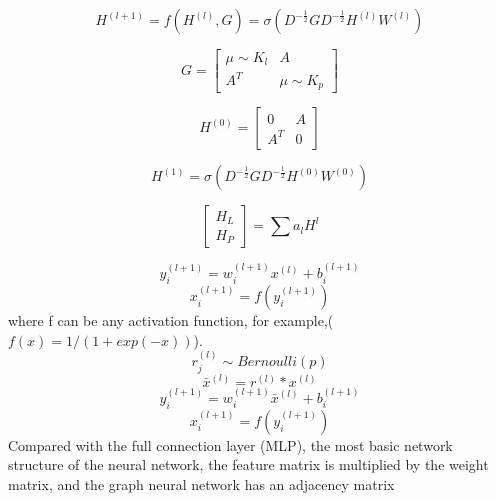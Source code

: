\documentclass[fleqn,10pt]{wlscirep}
\begin{document}
\begin{equation}
{H^{(l + 1)}} = f({H^{(l)}},G) = \sigma ({D^{ - \frac{1}{2}}}G{D^{ - \frac{1}{2}}}{H^{(l)}}{W^{(l)}})
\end{equation}

\begin{equation}
G = \left[ {\begin{array}{*{20}{c}}
{\mu  \sim {K_l}}&A\\
{{A^T}}&{\mu  \sim {K_p}}
\end{array}} \right]
\end{equation}

\begin{equation}
{H^{(0)}} = \left[ {\begin{array}{*{20}{c}}
0&A\\
{{A^T}}&0
\end{array}} \right]
\end{equation}

\begin{equation}
{H^{(1)}} = \sigma ({D^{ - \frac{1}{2}}}G{D^{ - \frac{1}{2}}}{H^{(0)}}{W^{(0)}})
\end{equation}


\begin{equation}
\left[ {\begin{array}{*{20}{c}}
{{H_L}}\\
{{H_P}}
\end{array}} \right] = \sum {{a_l}{H^l}}
\end{equation}

\begin{equation}
y_i^{(l + 1)} = w_i^{(l + 1)}{x^{(l)}} + b_i^{(l + 1)}
\end{equation}
\begin{equation}
x_i^{(l + 1)} = f(y_i^{(l + 1)})
\end{equation}
where f can be any activation function, for example,($f(x) = 1/(1+exp(-x))$).
\begin{equation}
r_j^{(l)} \sim Bernoulli(p)
\end{equation}
\begin{equation}
{\bar x^{(l)}} = {r^{(l)}}*{x^{(l)}}
\end{equation}
\begin{equation}
y_i^{(l + 1)} = w_i^{(l + 1)}{\bar x^{(l)}} + b_i^{(l + 1)}
\end{equation}
\begin{equation}
x_i^{(l + 1)} = f(y_i^{(l + 1)})
\end{equation}
Compared with the full connection layer (MLP), the most basic network structure of the neural network, the feature matrix is multiplied by the weight matrix, and the graph neural network has an adjacency matrix
\end{document}
